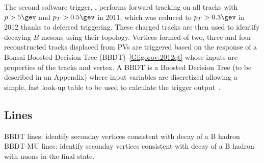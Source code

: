 The second software trigger, \hlttwo, performs forward tracking on all \velo tracks with
$p>5\gev$ and $p_T>0.5\gev$ in 2011; which was reduced to $p_T>0.3\gev$ in 2012 thanks to deferred
triggering.
These charged tracks are then used to identify decaying $B$ mesons using their topology.
Vertices formed of two, three and four reconstructed tracks displaced from PVs are triggered based
on the response of a Bonsai Boosted Decision Tree (BBDT)~\ref{Gligorov:2012qt} whose inputs are
properties of the tracks and vertex.
A BBDT is a Boosted Decision Tree (to be described in an Appendix) where input variables are
discretized allowing a simple, fast look-up table to be used to calculate the trigger
output~\cite{Gligorov:2012qt}.








\subsection{Lines}
BBDT lines: identify seconday vertices consistent with decay of a B hadron
BBDT-MU lines: identify seconday vertices consistent with decay of a B hadron with nuons in the
final state.



